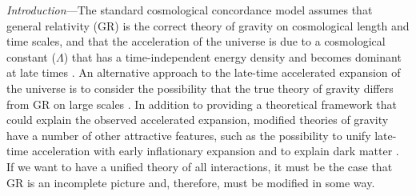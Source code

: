 \documentclass[prd,twocolumn,aps,psfig,nofootinbib,nobibnotes,superscriptaddress,preprintnumbers,times]{revtex4-2}
\begin{document}
\textit{Introduction}---The standard cosmological concordance model assumes that general relativity (GR) is the correct theory of gravity on cosmological length and time scales, and that the acceleration of the universe
is due to a cosmological constant ($\Lambda$) that has a time-independent energy density and becomes dominant at late times \cite{Copeland:2006wr, Peebles:2002gy}. 
An alternative approach to the late-time accelerated expansion of the universe is
to consider the possibility that the true theory of gravity differs from GR on large scales \cite{Clifton:2011jh, Nojiri:2017ncd, Joyce:2014kja, Planck:2015bue}. 
In addition to providing a theoretical framework that could explain the observed accelerated expansion, modified theories of gravity have a number of other attractive features, such as the possibility to unify late-time acceleration with early inflationary expansion \cite{Hinterbichler:2011tt,Clifton:2011jh,Nojiri:2010wj,Joyce:2014kja} 
and to explain dark matter \cite{Blas:2024jyh, Aoki:2016zgp}. 
If we want to have a unified theory of all interactions, it must be the case that GR is an incomplete picture and, therefore, must be modified in some way.
\end{document}
